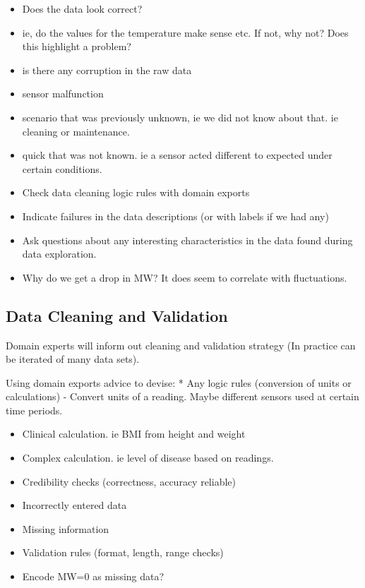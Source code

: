 \documentclass[11pt]{article}
\begin{document}
\begin{itemize}
\item
  Does the data look correct?
\item
  ie, do the values for the temperature make sense etc. If not, why not?
  Does this highlight a problem?
\item
  is there any corruption in the raw data
\item
  sensor malfunction
\item
  scenario that was previously unknown, ie we did not know about that.
  ie cleaning or maintenance.
\item
  quick that was not known. ie a sensor acted different to expected
  under certain conditions.
\item
  Check data cleaning logic rules with domain exports
\item
  Indicate failures in the data descriptions (or with labels if we had
  any)
\item
  Ask questions about any interesting characteristics in the data found
  during data exploration.
\item
  Why do we get a drop in MW? It does seem to correlate with
  fluctuations.
\end{itemize}

    \subsection{Data Cleaning and
Validation}\label{data-cleaning-and-validation}

Domain experts will inform out cleaning and validation strategy (In
practice can be iterated of many data sets).

Using domain exports advice to devise: * Any logic rules (conversion of
units or calculations) - Convert units of a reading. Maybe different
sensors used at certain time periods.

\begin{itemize}
\item
  Clinical calculation. ie BMI from height and weight
\item
  Complex calculation. ie level of disease based on readings.
\item
  Credibility checks (correctness, accuracy reliable)
\item
  Incorrectly entered data
\item
  Missing information
\item
  Validation rules (format, length, range checks)
\item
  Encode MW=0 as missing data?
\end{itemize}
\end{document}
